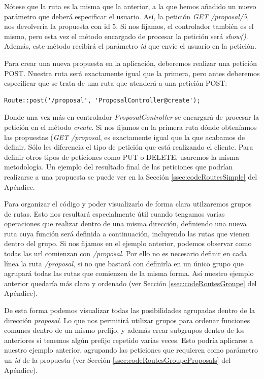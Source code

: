 Nótese que la ruta es la misma que la anterior, a la que hemos añadido un nuevo parámetro que deberá especificar el usuario. Así, la petición \textit{GET /proposal/5}, nos devolvería la propuesta con id 5. Si nos fijamos, el controlador también es el mismo, pero esta vez el método encargado de procesar la petición será \textit{show()}. Además, este método recibirá el parámetro \textit{{id}} que envíe el usuario en la petición.

Para crear una nueva propuesta en la aplicación, deberemos realizar una petición POST. Nuestra ruta será exactamente igual que la primera, pero antes deberemos especificar que se trata de una ruta que atenderá a una petición POST:

\lstset{
  language        = php}
\begin{lstlisting}[frame=single]	
Route::post('/proposal', 'ProposalController@create');
\end{lstlisting}

Donde una vez más en controlador \textit{ProposalController} se encargará de procesar la petición en el método \textit{create}. Si nos fijamos en la primera ruta dónde obteníamos las propuestas (\textit{GET /proposal}, es exactamente igual que la que acabamos de definir. Sólo les diferencia el tipo de petición que está realizando el cliente. Para definir otros tipos de peticiones como PUT o DELETE, usaremos la misma metodología. Un ejemplo del resultado final de las peticiones que podrían realizarse a una propuesta se puede ver en la Sección \ref{ssec:codeRoutesSimple} del Apéndice.

Para organizar el código y poder visualizarlo de forma clara utilzaremos grupos de rutas. Esto nos resultará especialmente útil cuando tengamos varias operaciones que realizar dentro de una misma dirección, definiendo una nueva ruta cuya función será definida a continuación, incluyendo las rutas que vienen dentro del grupo. Si nos fijamos en el ejemplo anterior, podemos observar como todas las url comienzan con \textit{/proposal}. Por ello no es necesario definir en cada línea la ruta \textit{/proposal}, si no que bastará con definirla en un único grupo que agrupará todas las rutas que comienzen de la misma forma. Así nuestro ejemplo anterior quedaría más claro y ordenado (ver Sección \ref{ssec:codeRoutesGroupe} del Apéndice).

De esta forma podemos visualizar todas las posibilidades agrupadas dentro de la dirección \textit{proposal}. Lo que nos permitirá utilizar grupos para ordenar funciones comunes dentro de un mismo prefijo, y además crear subgrupos dentro de los anteriores si tenemos algún prefijo repetido varias veces. Esto podría aplicarse a nuestro ejemplo anterior, agrupando las peticiones que requieren como parámetro un \textit{id} de la propuesta (ver Sección \ref{ssec:codeRoutesGroupeProposals} del Apéndice).

